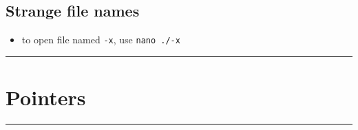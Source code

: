 \documentclass[10pt, multicolumn, a4paper]{article}
\begin{document}
\begin{multicols}{2}
	\subsection*{Strange file names}
	\begin{itemize}
	\item to open file named \verb|-x|, use \verb|nano ./-x|
	\end{itemize}
\end{multicols}


\hrule
\section{Pointers}
\hrule 
\end{document}
